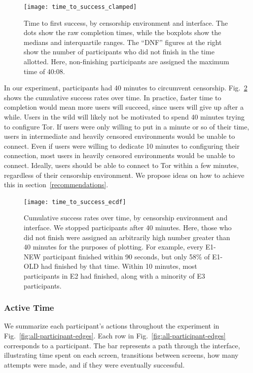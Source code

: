 \documentclass[USenglish,oneside,twocolumn]{article}
\begin{document}
{\begin{figure}[t]
\centering
\texttt{[image: time\_to\_success\_clamped]}
\caption{
Time to first success, by censorship environment and interface.
The dots show the raw completion times,
while the boxplots show the medians and interquartile ranges.
The ``DNF'' figures at the right show the number of participants 
who did not finish in the time allotted.
Here, non-finishing participants are assigned the maximum time of 40:08.
}
\label{fig:time_to_success_clamped}
\end{figure}

In our experiment, participants had 40 minutes to circumvent censorship. Fig.~\ref{fig:time_to_success_ecdf} shows the cumulative success rates over time. In practice, faster time to completion would mean more users will succeed, since users will give up after a while. Users in the wild will likely not be motivated to spend 40 minutes trying to configure Tor. If users were only willing to put in a minute or so of their time, users in intermediate and heavily censored environments would be unable to connect. Even if users were willing to dedicate 10 minutes to configuring their connection, most users in heavily censored environments would be unable to connect. Ideally, users should be able to connect to Tor within a few minutes, regardless of their censorship environment. We propose ideas on how to achieve this in section~\ref{recommendations}. 

\begin{figure}[t]
\centering
\texttt{[image: time\_to\_success\_ecdf]}

\caption{
Cumulative success rates over time, by censorship environment and interface.
We stopped participants after 40 minutes. Here, those who did not finish were assigned
an arbitrarily high number greater than 40 minutes for the purposes of plotting. 
For example, every E1-NEW participant finished within 90 seconds,
but only 58\% of E1-OLD had finished by that time. Within 10 minutes, most
participants in E2 had finished, along with a minority of E3 participants. 
}
\label{fig:time_to_success_ecdf}
\end{figure}

\subsubsection{Active Time} 
We summarize each participant's actions throughout the experiment in Fig.~\ref{fig:all-participant-edges}.
Each row in Fig.~\ref{fig:all-participant-edges} corresponds to a participant. The bar represents a path through the interface, illustrating time spent on each screen, transitions between screens, how many attempts were made, and if they were eventually successful. 

}
\end{document}
